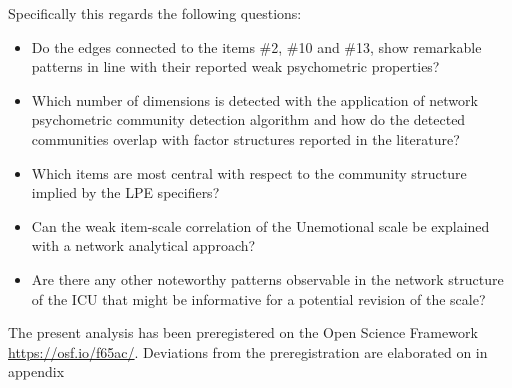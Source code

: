 Specifically this regards the following questions:
\begin{itemize}
	\item Do the edges connected to the items \#2, \#10 and \#13, show remarkable patterns in line with their reported weak psychometric properties?
	\item Which number of dimensions is detected with the application of network psychometric community detection algorithm and how do the detected communities overlap with factor structures reported in the literature?
	\item Which items are most central with respect to the community structure implied by the LPE specifiers?
	\item Can the weak item-scale correlation of the Unemotional scale be explained with a network analytical approach?
	\item Are there any other noteworthy patterns observable in the network structure of the ICU that might be informative for a potential revision of the scale?
\end{itemize}



The present analysis has been preregistered on the Open Science Framework \url{https://osf.io/f65ac/}.  
Deviations from the preregistration are elaborated on in appendix  



